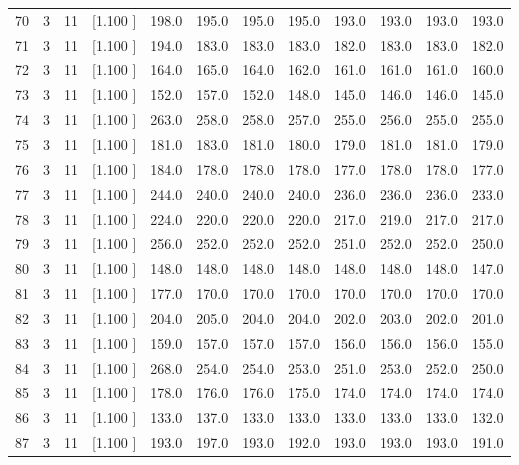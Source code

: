 \documentclass[12pt,a4paper]{article}
\begin{document}
\begin{center}
{\begin{tabular}{r r r r r r r r r r r r}
  70&  3& 11&[1.100     ]&   198.0&   195.0&   195.0&   195.0&   193.0&   193.0&   193.0&   193.0\\[-0.02in]
  71&  3& 11&[1.100     ]&   194.0&   183.0&   183.0&   183.0&   182.0&   183.0&   183.0&   182.0\\[-0.02in]
  72&  3& 11&[1.100     ]&   164.0&   165.0&   164.0&   162.0&   161.0&   161.0&   161.0&   160.0\\[-0.02in]
  73&  3& 11&[1.100     ]&   152.0&   157.0&   152.0&   148.0&   145.0&   146.0&   146.0&   145.0\\[-0.02in]
  74&  3& 11&[1.100     ]&   263.0&   258.0&   258.0&   257.0&   255.0&   256.0&   255.0&   255.0\\[-0.02in]
  75&  3& 11&[1.100     ]&   181.0&   183.0&   181.0&   180.0&   179.0&   181.0&   181.0&   179.0\\[-0.02in]
  76&  3& 11&[1.100     ]&   184.0&   178.0&   178.0&   178.0&   177.0&   178.0&   178.0&   177.0\\[-0.02in]
  77&  3& 11&[1.100     ]&   244.0&   240.0&   240.0&   240.0&   236.0&   236.0&   236.0&   233.0\\[-0.02in]
  78&  3& 11&[1.100     ]&   224.0&   220.0&   220.0&   220.0&   217.0&   219.0&   217.0&   217.0\\[-0.02in]
  79&  3& 11&[1.100     ]&   256.0&   252.0&   252.0&   252.0&   251.0&   252.0&   252.0&   250.0\\[-0.02in]
  80&  3& 11&[1.100     ]&   148.0&   148.0&   148.0&   148.0&   148.0&   148.0&   148.0&   147.0\\[-0.02in]
  81&  3& 11&[1.100     ]&   177.0&   170.0&   170.0&   170.0&   170.0&   170.0&   170.0&   170.0\\[-0.02in]
  82&  3& 11&[1.100     ]&   204.0&   205.0&   204.0&   204.0&   202.0&   203.0&   202.0&   201.0\\[-0.02in]
  83&  3& 11&[1.100     ]&   159.0&   157.0&   157.0&   157.0&   156.0&   156.0&   156.0&   155.0\\[-0.02in]
  84&  3& 11&[1.100     ]&   268.0&   254.0&   254.0&   253.0&   251.0&   253.0&   252.0&   250.0\\[-0.02in]
  85&  3& 11&[1.100     ]&   178.0&   176.0&   176.0&   175.0&   174.0&   174.0&   174.0&   174.0\\[-0.02in]
  86&  3& 11&[1.100     ]&   133.0&   137.0&   133.0&   133.0&   133.0&   133.0&   133.0&   132.0\\[-0.02in]
  87&  3& 11&[1.100     ]&   193.0&   197.0&   193.0&   192.0&   193.0&   193.0&   193.0&   191.0\\[-0.02in]

\end{tabular}}
\end{center}
\end{document}
